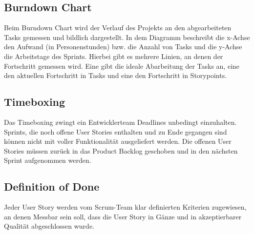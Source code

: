 \subsection{Burndown Chart}
Beim Burndown Chart wird der Verlauf des Projekts an den abgearbeiteten Tasks gemessen und bildlich dargestellt. In dem Diagramm beschreibt die x-Achse den Aufwand (in Personenstunden) bzw. die Anzahl von Tasks und die y-Achse die Arbeitstage des Sprints. 
Hierbei gibt es mehrere Linien, an denen der Fortschritt gemessen wird. Eine gibt die ideale Abarbeitung der Tasks an, eine den aktuellen Fortschritt in Tasks und eine den Fortschritt in Storypoints.
\subsection{Timeboxing}
Das Timeboxing zwingt ein Entwicklerteam Deadlines unbedingt einzuhalten. Sprints, die noch offene User Stories enthalten und zu Ende gegangen sind können nicht mit voller Funktionalität ausgeliefert werden. Die offenen User Stories müssen zurück in das Product Backlog geschoben und in den nächsten Sprint aufgenommen werden.
\subsection{Definition of Done}
Jeder User Story werden vom Scrum-Team klar definierten Kriterien zugewiesen, an denen Messbar sein soll, dass die User Story in Gänze und in akzeptierbarer Qualität abgeschlossen wurde.

